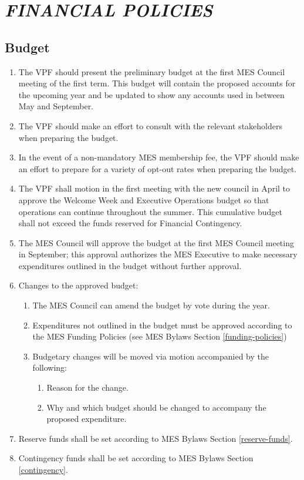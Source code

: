  \section{\texorpdfstring{\emph{FINANCIAL
     POLICIES}}{FINANCIAL POLICIES}}
\label{financial-policies}

\subsection{Budget}
\label{budget}
\begin{enumerate}
 \item
  The VPF should present the preliminary budget at the first MES Council
  meeting of the first term. This budget will contain the proposed
  accounts for the upcoming year and be updated to show any accounts
  used in between May and September.
 \item
  The VPF should make an effort to consult with the relevant
  stakeholders when preparing the budget.
 \item
  In the event of a non-mandatory MES membership fee, the VPF should
  make an effort to prepare for a variety of opt-out rates when
  preparing the budget.
 \item
  The VPF shall motion in the first meeting with the new council in
  April to approve the Welcome Week and Executive Operations budget so
  that operations can continue throughout the summer. This cumulative
  budget shall not exceed the funds reserved for Financial Contingency.
 \item
  The MES Council will approve the budget at the first MES Council
  meeting in September; this approval authorizes the MES Executive to
  make necessary expenditures outlined in the budget without further
  approval.
 \item
  Changes to the approved budget:

  \begin{enumerate}
   \item
    The MES Council can amend the budget by vote during the year.
   \item
    Expenditures not outlined in the budget must be approved according
    to the MES Funding Policies (see MES Bylaws Section \ref{funding-policies})
   \item
    Budgetary changes will be moved via motion accompanied by the
    following:

    \begin{enumerate}
     \item
      Reason for the change.
     \item
      Why and which budget should be changed to accompany the proposed
      expenditure.
    \end{enumerate}
  \end{enumerate}
 \item
  Reserve funds shall be set according to MES Bylaws Section \ref{reserve-funds}.
 \item
  Contingency funds shall be set according to MES Bylaws Section
  \ref{contingency}.

\end{enumerate}

